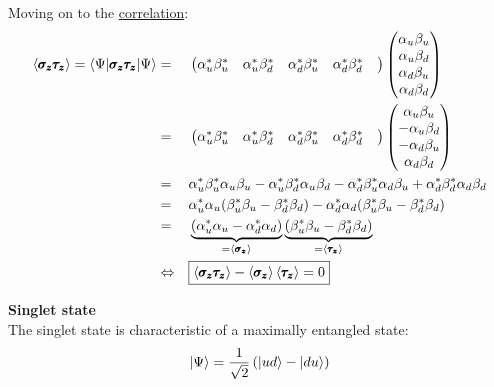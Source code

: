 \documentclass[solutions.tex]{subfiles}
\begin{document}
Moving on to the \underline{correlation}:
\begin{equation*}\begin{aligned}
	\left\langle \pmb{\sigma_z\tau_z} \right\rangle = \langle \Psi|\pmb{\sigma_z\tau_z}|\Psi\rangle
		&=&& \begin{pmatrix}
			\alpha_u^*\beta_u^* &
			\alpha_u^*\beta_d^* &
			\alpha_d^*\beta_u^* &
			\alpha_d^*\beta_d^* &
		\end{pmatrix}\begin{pmatrix}
			\alpha_u\beta_u \\
			\alpha_u\beta_d \\
			\alpha_d\beta_u \\
			\alpha_d\beta_d \\
		\end{pmatrix} \\
	~ &=&& \begin{pmatrix}
			\alpha_u^*\beta_u^* &
			\alpha_u^*\beta_d^* &
			\alpha_d^*\beta_u^* &
			\alpha_d^*\beta_d^* &
		\end{pmatrix}\begin{pmatrix}
			\alpha_u\beta_u \\
			-\alpha_u\beta_d \\
			-\alpha_d\beta_u \\
			\alpha_d\beta_d \\
		\end{pmatrix} \\
	~ &=&& \alpha_u^*\beta_u^*\alpha_u\beta_u
			-\alpha_u^*\beta_d^*\alpha_u\beta_d
			-\alpha_d^*\beta_u^*\alpha_d\beta_u
			+\alpha_d^*\beta_d^*\alpha_d\beta_d \\
	~ &=&& \alpha_u^*\alpha_u(
			\beta_u^*\beta_u - \beta_d^*\beta_d
		) -\alpha_d^*\alpha_d(
			\beta_u^*\beta_u - \beta_d^*\beta_d
		) \\
	~ &=&& \underbrace{
			(\alpha_u^*\alpha_u - \alpha_d^*\alpha_d)
		}_{=\left\langle \pmb{\sigma_z} \right\rangle}
			\underbrace{
			(\beta_u^*\beta_u - \beta_d^*\beta_d)
		}_{=\left\langle \pmb{\tau_z} \right\rangle} \\
	~ &\Leftrightarrow&& \boxed{
		\left\langle \pmb{\sigma_z\tau_z} \right\rangle -\left\langle \pmb{\sigma_z} \right\rangle\left\langle \pmb{\tau_z} \right\rangle = 0
	}
\end{aligned}\end{equation*}

\hr

\textbf{Singlet state}\ \\

The singlet state is characteristic of a maximally entangled state:
\[
	|\Psi\rangle = \frac1{\sqrt2}\left(|ud\rangle-|du\rangle\right)
\]
\end{document}
